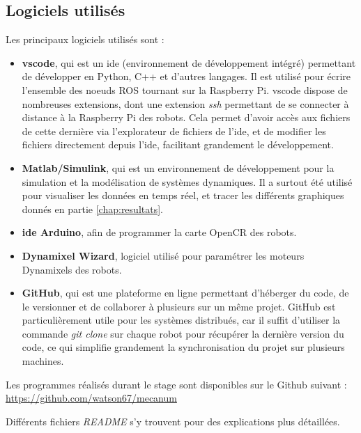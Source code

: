 \subsection{Logiciels utilisés}

\noindent Les principaux logiciels utilisés sont :
\begin{itemize}
    \item \textbf{\gls{vscode}}, qui est un \gls{ide} (environnement de développement intégré) permettant de développer en Python, C++ et d'autres langages. Il est utilisé pour écrire l'ensemble des noeuds ROS tournant sur la Raspberry Pi. \gls{vscode} dispose de nombreuses extensions, dont une extension \textit{ssh} permettant de se connecter à distance à la Raspberry Pi des robots. Cela permet d'avoir accès aux fichiers de cette dernière via l'explorateur de fichiers de l'\gls{ide}, et de modifier les fichiers directement depuis l'\gls{ide}, facilitant grandement le développement.
    \item \textbf{Matlab/Simulink}, qui est un environnement de développement pour la simulation et la modélisation de systèmes dynamiques. Il a surtout été utilisé pour visualiser les données en temps réel, et tracer les différents graphiques donnés en partie \ref{chap:resultats}.
    \item \textbf{\gls{ide} Arduino}, afin de programmer la carte OpenCR des robots.
    \item \textbf{Dynamixel Wizard}, logiciel utilisé pour paramétrer les moteurs Dynamixels des robots.
    \item \textbf{GitHub}, qui est une plateforme en ligne permettant d’héberger du code, de le versionner et de collaborer à plusieurs sur un même projet. GitHub est particulièrement utile pour les systèmes distribués, car il suffit d'utiliser la commande \textit{git clone} sur chaque robot pour récupérer la dernière version du code, ce qui simplifie grandement la synchronisation du projet sur plusieurs machines.
\end{itemize}

Les programmes réalisés durant le stage sont disponibles sur le Github suivant : 
\newline \url{https://github.com/watson67/mecanum}

\noindent Différents fichiers \textit{README} s'y trouvent pour des explications plus détaillées. 
